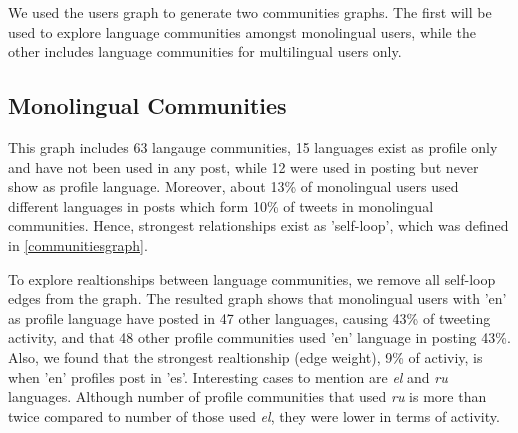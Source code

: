 \documentclass{llncs}
\begin{document}
We used the users graph to generate two communities graphs. The first will
be used to explore language communities amongst monolingual users, while the other
includes language communities for multilingual users only.


\subsection{Monolingual Communities}

This graph includes 63 langauge communities, 15 languages exist as profile only and
have not been used in any post, while 12 were used in posting but never show as profile
language. Moreover, about 13\% of monolingual users used different languages
in posts which form 10\% of tweets in monolingual communities. Hence, strongest
relationships exist as 'self-loop', which was defined in \ref{communitiesgraph}.

To explore realtionships between language communities, we remove all self-loop 
edges from the graph. The resulted graph shows that monolingual users with 'en' as 
profile language have posted in 47 other languages, causing 43\%
of tweeting activity, and that 48 other profile communities used 'en' language
in posting 43\%. Also, we found that the strongest realtionship (edge weight),
9\% of activiy, is when 'en' profiles post in 'es'. Interesting cases to mention are
\emph{el} and \emph{ru} languages. Although number of profile communities that used \emph{ru}
is more than twice compared to number of those used \emph{el}, they were lower in
terms of activity.

\end{document}
